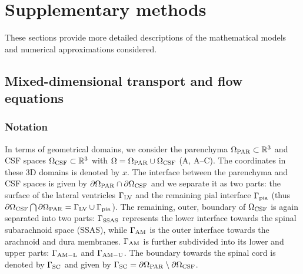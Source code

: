 \section{Supplementary methods}

These sections provide more detailed descriptions of the mathematical models and numerical approximations considered.

\subsection{Mixed-dimensional transport and flow equations}
\label{sec:more_maths}

\subsubsection{Notation}

In terms of geometrical domains, we consider the parenchyma
$\Omega_{\rm PAR} \subset \mathbb{R}^3$ and CSF spaces $\Omega_{\rm CSF}
\subset \mathbb{R}^3$ with $\Omega = \Omega_{\rm PAR} \cup \Omega_{\rm CSF}$
(A, A--C). The coordinates in these
3D domains is denoted by $x$. The interface between the parenchyma and
CSF spaces is given by $\partial \Omega_{\rm PAR} \cap \partial
\Omega_{\rm CSF}$ and we separate it as two parts: the surface of the
lateral ventricles $\Gamma_{\rm LV}$ and the remaining pial interface
$\Gamma_{\rm pia}$ (thus $\partial \Omega_{\rm CSF} \bigcap \partial
\Omega_{\rm PAR} = \Gamma_{\rm LV} \cup \Gamma_{\rm pia}$). The
remaining, outer, boundary of $\Omega_{\rm CSF}$ is again separated
into two parts: $\Gamma_{\rm SSAS}$ represents the lower interface
towards the spinal subarachnoid space (SSAS), while $\Gamma_{\rm AM}$
is the outer interface towards the arachnoid and dura
membranes. $\Gamma_{\rm AM}$ is further subdivided into its lower and
upper parts: $\Gamma_{\rm AM-L}$ and $\Gamma_{\rm AM-U}$. The boundary
towards the spinal cord is denoted by $\Gamma_{\rm{SC}}$ and given by
$\Gamma_{\rm{SC}} = \partial \Omega_{\rm PAR} \setminus \partial
\Omega_{\rm CSF}$.

